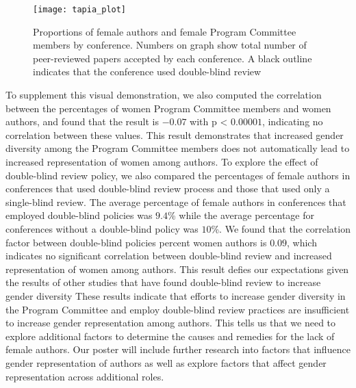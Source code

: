 \documentclass{sig-alternate-05-2015}
\begin{document}
\begin{figure}[ht]
\centering
\texttt{[image: tapia\_plot]}
\caption{Proportions of female authors and female Program Committee members by conference. Numbers on graph show total number of peer-reviewed papers accepted by each conference. A black outline indicates that the conference used double-blind review}
\end{figure}

To supplement this visual demonstration, we also computed the correlation between the percentages of women Program Committee members and women authors, and found that the result is $-0.07$ with p < $0.00001$, indicating no correlation between these values. This result demonstrates that increased gender diversity among the Program Committee members does not automatically lead to increased representation of women among authors. To explore the effect of double-blind review policy, we also compared the percentages of female authors in conferences that used double-blind review process and those that used only a single-blind review. The average percentage of female authors in conferences that employed double-blind policies was $9.4$\% while the average percentage for conferences without a double-blind policy was $10$\%. We found that the correlation factor between double-blind policies percent women authors is $0.09$, which indicates no significant correlation between double-blind review and increased representation of women among authors. This result defies our expectations given the results of other studies that have found double-blind review to increase gender diversity \cite{double:blind}       
These results indicate that efforts to increase gender diversity in the Program Committee and employ double-blind review practices are insufficient to increase gender representation among authors. This tells us that we need to explore additional factors to determine the causes and remedies for the lack of female authors. Our poster will include further research into factors that influence gender representation of authors as well as explore factors that affect gender representation across additional roles. 
\end{document}
